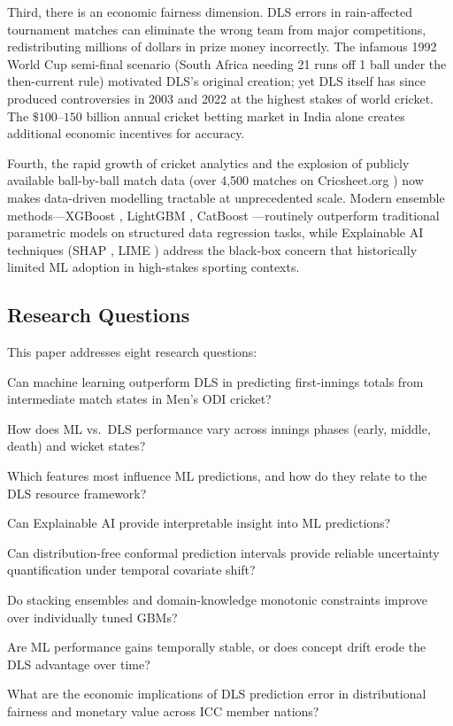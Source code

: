 \documentclass[10pt,a4paper,twocolumn]{article}
\begin{document}
Third, there is an economic fairness dimension. DLS errors in rain-affected tournament matches can eliminate the wrong team from major competitions, redistributing millions of dollars in prize money incorrectly. The infamous 1992 World Cup semi-final scenario (South Africa needing 21 runs off 1 ball under the then-current rule) motivated DLS's original creation; yet DLS itself has since produced controversies in 2003 and 2022 at the highest stakes of world cricket. The $\$100$--$150$ billion annual cricket betting market in India alone creates additional economic incentives for accuracy.

Fourth, the rapid growth of cricket analytics and the explosion of publicly available ball-by-ball match data (over 4,500 matches on Cricsheet.org \citep{cricsheet}) now makes data-driven modelling tractable at unprecedented scale. Modern ensemble methods---XGBoost \citep{chen2016xgboost}, LightGBM \citep{ke2017lightgbm}, CatBoost \citep{prokhorenkova2018catboost}---routinely outperform traditional parametric models on structured data regression tasks, while Explainable AI techniques (SHAP \citep{lundberg2017unified}, LIME \citep{ribeiro2016should}) address the black-box concern that historically limited ML adoption in high-stakes sporting contexts.

\subsection{Research Questions}

This paper addresses eight research questions:

\begin{description}[leftmargin=0em,style=unboxed,noitemsep]
\item[\textbf{RQ1}:] Can machine learning outperform DLS in predicting first-innings totals from intermediate match states in Men's ODI cricket?
\item[\textbf{RQ2}:] How does ML vs.\ DLS performance vary across innings phases (early, middle, death) and wicket states?
\item[\textbf{RQ3}:] Which features most influence ML predictions, and how do they relate to the DLS resource framework?
\item[\textbf{RQ4}:] Can Explainable AI provide interpretable insight into ML predictions?
\item[\textbf{RQ5}:] Can distribution-free conformal prediction intervals provide reliable uncertainty quantification under temporal covariate shift?
\item[\textbf{RQ6}:] Do stacking ensembles and domain-knowledge monotonic constraints improve over individually tuned GBMs?
\item[\textbf{RQ7}:] Are ML performance gains temporally stable, or does concept drift erode the DLS advantage over time?
\item[\textbf{RQ8}:] What are the economic implications of DLS prediction error in distributional fairness and monetary value across ICC member nations?
\end{description}
\end{document}
